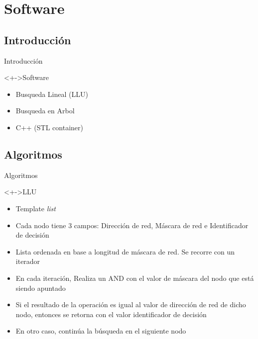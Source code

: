 \documentclass[xcolor=dvipsnames]{beamer}
\begin{document}
\section{Software}
\subsection{Introducción}

\begin{frame}{Introducción}
 \begin{block}<+->{Software}
	\begin{itemize}
      \scriptsize
	\item Busqueda Lineal (LLU)
	\item Busqueda en Arbol
	\item C++ (STL container)	
	   \end{itemize}
\end{block}
\end{frame}



\subsection{Algoritmos}
\begin{frame}{Algoritmos}
\begin{block}<+->{LLU}   
    \begin{itemize}
      \scriptsize
     	
     	\item Template \emph{list}
     	\item Cada nodo tiene 3 campos: Dirección de red, Máscara de red e Identificador de decisión
	\item Lista ordenada en base a longitud de máscara de red. Se recorre con un iterador
	\item En cada iteración, Realiza un AND con el valor de máscara del nodo que está siendo apuntado
	\item Si el resultado de la operación es igual al valor de dirección de red de dicho nodo, entonces se retorna con el valor identificador de decisión
	\item En otro caso, continúa la búsqueda en el siguiente nodo
    \end{itemize}
  \end{block}
\end{frame}
\end{document}
